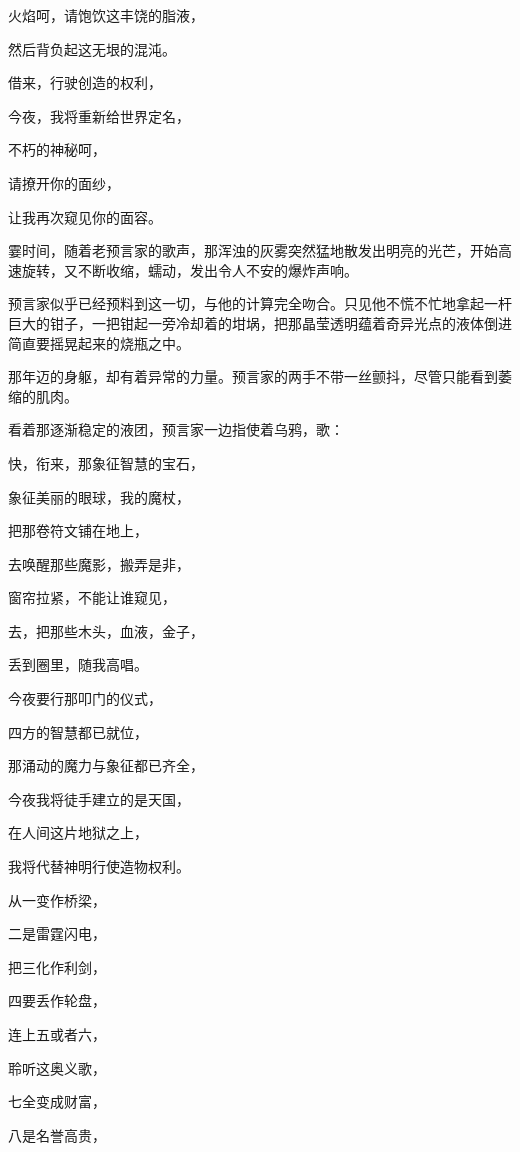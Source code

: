 \documentclass[UTF8]{article}
\begin{document}
\par 火焰呵，请饱饮这丰饶的脂液，
\par 然后背负起这无垠的混沌。
\par 借来，行驶创造的权利，
\par 今夜，我将重新给世界定名，
\par 不朽的神秘呵，
\par 请撩开你的面纱，
\par 让我再次窥见你的面容。
\\[0.6cm]
\par 霎时间，随着老预言家的歌声，那浑浊的灰雾突然猛地散发出明亮的光芒，开始高速旋转，又不断收缩，蠕动，发出令人不安的爆炸声响。
\par 预言家似乎已经预料到这一切，与他的计算完全吻合。只见他不慌不忙地拿起一杆巨大的钳子，一把钳起一旁冷却着的坩埚，把那晶莹透明蕴着奇异光点的液体倒进简直要摇晃起来的烧瓶之中。
\par 那年迈的身躯，却有着异常的力量。预言家的两手不带一丝颤抖，尽管只能看到萎缩的肌肉。
\\[0.6cm]
\par 看着那逐渐稳定的液团，预言家一边指使着乌鸦，歌：
\\[0.6cm]
\par 快，衔来，那象征智慧的宝石，
\par 象征美丽的眼球，我的魔杖，
\par 把那卷符文铺在地上，
\par 去唤醒那些魔影，搬弄是非，
\par 窗帘拉紧，不能让谁窥见，
\par 去，把那些木头，血液，金子，
\par 丢到圈里，随我高唱。
\par 今夜要行那叩门的仪式，
\par 四方的智慧都已就位，
\par 那涌动的魔力与象征都已齐全，
\par 今夜我将徒手建立的是天国，
\par 在人间这片地狱之上，
\par 我将代替神明行使造物权利。
\par 从一变作桥梁，
\par 二是雷霆闪电，
\par 把三化作利剑，
\par 四要丢作轮盘，
\par 连上五或者六，
\par 聆听这奥义歌，
\par 七全变成财富，
\par 八是名誉高贵，
\end{document}

